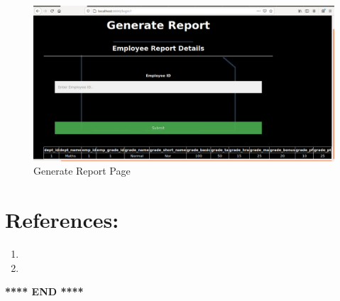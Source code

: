 \documentclass[12pt]{article}
\begin{document}
\begin{figure}
    \centering
    \includegraphics[width = \columnwidth]{screenshots/generatereportinsertion.jpeg}
    \caption{Generate Report Page}
    \label{fig:my_label}
\end{figure}

\newpage
\section{References:}
\begin{enumerate}
    \item 
    \item 
\end{enumerate}


\begin{center}
    \textbf{**** END ****}
\end{center}
\end{document}

